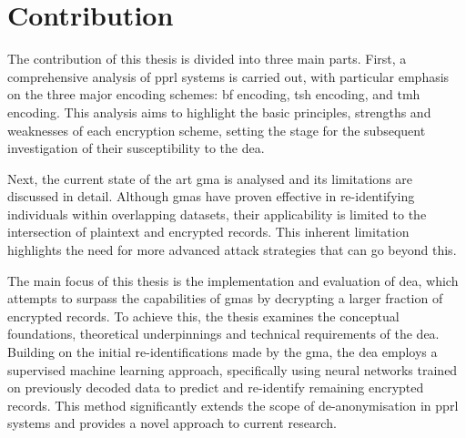 





\section{Contribution}  \label{sec:contribution}

The contribution of this thesis is divided into three main parts. 
First, a comprehensive analysis of \ac{pprl} systems is carried out, with particular emphasis on the three major encoding schemes: \ac{bf} encoding, \ac{tsh} encoding, and \ac{tmh} encoding. 
This analysis aims to highlight the basic principles, strengths and weaknesses of each encryption scheme, setting the stage for the subsequent investigation of their susceptibility to the \ac{dea}.

Next, the current state of the art \ac{gma} is analysed and its limitations are discussed in detail. 
Although \ac{gma}s have proven effective in re-identifying individuals within overlapping datasets, their applicability is limited to the intersection of plaintext and encrypted records. 
This inherent limitation highlights the need for more advanced attack strategies that can go beyond this.

The main focus of this thesis is the implementation and evaluation of \ac{dea}, which attempts to surpass the capabilities of \ac{gma}s by decrypting a larger fraction of encrypted records. 
To achieve this, the thesis examines the conceptual foundations, theoretical underpinnings and technical requirements of the \ac{dea}. 
Building on the initial re-identifications made by the \ac{gma}, the \ac{dea} employs a supervised machine learning approach, specifically using neural networks trained on previously decoded data to predict and re-identify remaining encrypted records. 
This method significantly extends the scope of de-anonymisation in \ac{pprl} systems and provides a novel approach to current research.

